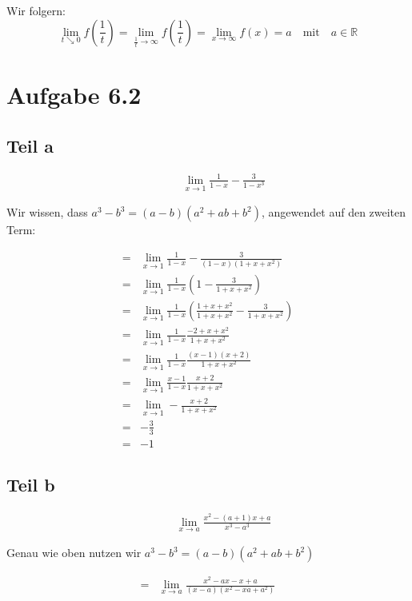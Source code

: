 \documentclass[a4paper,german,12pt,smallheadings]{scrartcl}
\begin{document}
Wir folgern:
\begin{equation*}
\lim\limits_{t \searrow 0} f(\frac{1}{t})=\lim\limits_{\frac{1}{t} \to \infty} f(\frac{1}{t})=\lim\limits_{x \to \infty} f(x)=a \quad \text{mit} \quad a\in\mathbb{R}
\end{equation*}

\section*{Aufgabe 6.2}
\subsection*{Teil a}

\begin{align*}
  \qquad&\lim_{x \to 1} \frac{1}{1-x} - \frac{3}{1-x^3}
\end{align*}

Wir wissen, dass $a^3 - b^3 = (a-b)(a^2 + ab + b^2)$, angewendet auf den zweiten Term:

\begin{align*}
  = &\lim_{x \to 1} \frac{1}{1-x} - \frac{3}{(1-x)(1+x+x^2)} \\
  = &\lim_{x \to 1} \frac{1}{1-x} \left(1 - \frac{3}{1+x+x^2}\right) \\
  = &\lim_{x \to 1} \frac{1}{1-x} \left(\frac{1+x+x^2}{1+x+x^2} - \frac{3}{1+x+x^2}\right) \\
  = &\lim_{x \to 1} \frac{1}{1-x} \frac{-2+x+x^2}{1+x+x^2} \\
  = &\lim_{x \to 1} \frac{1}{1-x} \frac{(x-1)(x+2)}{1+x+x^2} \\
  = &\lim_{x \to 1} \frac{x-1}{1-x} \frac{x+2}{1+x+x^2} \\
  = &\lim_{x \to 1} -\frac{x+2}{1+x+x^2} \\
  = &-\frac{3}{3} \\
  = &-1
\end{align*}


\subsection*{Teil b}

\begin{align*}
  \qquad&\lim_{x \to a} \frac{x^2 - (a+1)x + a}{x^3 - a^3}
\end{align*}

Genau wie oben nutzen wir $a^3 - b^3 = (a-b)(a^2 + ab + b^2)$

\begin{align*}
  = &\lim_{x \to a} \frac{x^2 - ax - x + a}{(x-a)(x^2 - xa + a^2)}
\end{align*}
\end{document}
